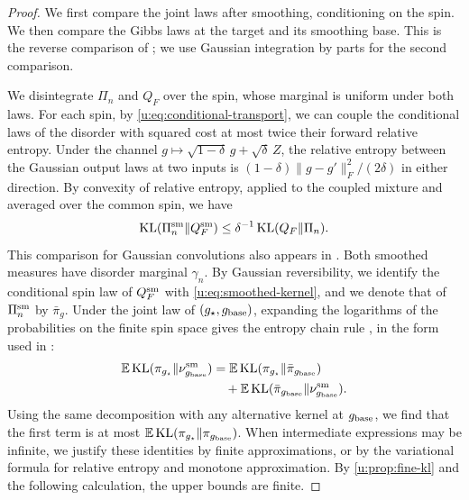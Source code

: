 \begin{proof}
We first compare the joint laws after smoothing, conditioning on the spin.
We then compare the Gibbs laws at the target and its smoothing base.
This is the reverse comparison of \cite[Section~5, Proposition~6]{oai-typical-upper};
we use Gaussian integration by parts for the second comparison.

We disintegrate $\Pi_n$ and $Q_F$ over the spin, whose marginal is uniform
under both laws. For each spin, by \eqref{u:eq:conditional-transport},
we can couple the conditional laws of the disorder with squared cost at
most twice their forward relative entropy. Under the channel
$g\mapsto\sqrt{1-\delta}\,g+\sqrt\delta\,Z$, the relative entropy between
the Gaussian output laws at two inputs is $(1-\delta)\|g-g'\|_F^2/(2\delta)$ in either
direction. By convexity of relative entropy, applied to the coupled mixture and
averaged over the common spin, we have
\begin{equation}\label{u:eq:smoothed-joint-entropy}
 \operatorname{KL}(\Pi_n^{\rm sm}\Vert Q_F^{\rm sm})
                 \le\delta^{-1}\operatorname{KL}(Q_F\Vert\Pi_n).
\end{equation}
This comparison for Gaussian convolutions also appears in
\cite[Lemma~11]{lugosi-neu-2022}. Both smoothed measures have disorder
marginal $\gamma_n$. By Gaussian reversibility, we identify the
conditional spin law of $Q_F^{\rm sm}$ with \eqref{u:eq:smoothed-kernel},
and we denote that of $\Pi_n^{\rm sm}$ by $\bar\pi_g$. Under the joint law of $(g_\star,g_{\rm base})$, expanding the logarithms
of the probabilities on the finite spin space gives the entropy chain
rule \cite[Chapter~4]{boucheron-lugosi-massart-2013}, in the form used in
\cite[Section~5, proof of Proposition~6]{oai-typical-upper}:
\begin{equation}\label{u:eq:entropy-decomposition}
 \begin{split}
 \mathbb E\operatorname{KL}(\pi_{g_\star}\Vert\nu^{\rm sm}_{g_{\rm base}})
 &=\mathbb E\operatorname{KL}(\pi_{g_\star}\Vert\bar\pi_{g_{\rm base}})\\
 &\quad+\mathbb E\operatorname{KL}(\bar\pi_{g_{\rm base}}\Vert\nu^{\rm sm}_{g_{\rm base}}).
 \end{split}
\end{equation}
Using the same decomposition with any alternative kernel at $g_{\rm base}$,
we find that the first term is at most
$\mathbb E\operatorname{KL}(\pi_{g_\star}\Vert\pi_{g_{\rm base}})$. When intermediate expressions may be infinite, we justify these
identities by finite approximations, or by the variational formula for relative entropy and monotone
approximation. By \cref{u:prop:fine-kl} and the following calculation,
the upper bounds are finite.


\end{proof}
